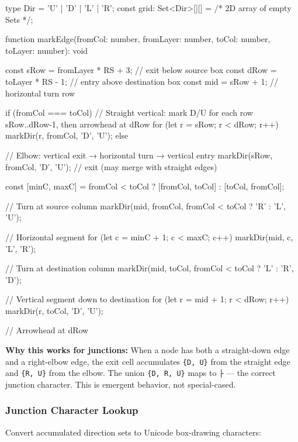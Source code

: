 \begin{CodeBlock}
type Dir = 'U' | 'D' | 'L' | 'R';
const grid: Set<Dir>[][] = /* 2D array of empty Sets */;

function markEdge(fromCol: number, fromLayer: number, toCol: number, toLayer: number): void {
  const sRow = fromLayer * RS + 3;   // exit below source box
  const dRow = toLayer * RS - 1;     // entry above destination box
  const mid = sRow + 1;              // horizontal turn row

  if (fromCol === toCol) {
    // Straight vertical: mark D/U for each row sRow..dRow-1, then arrowhead at dRow
    for (let r = sRow; r < dRow; r++) markDir(r, fromCol, 'D', 'U');
  } else {
    // Elbow: vertical exit → horizontal turn → vertical entry
    markDir(sRow, fromCol, 'D', 'U');          // exit (may merge with straight edges)

    const [minC, maxC] = fromCol < toCol ? [fromCol, toCol] : [toCol, fromCol];

    // Turn at source column
    markDir(mid, fromCol, fromCol < toCol ? 'R' : 'L', 'U');

    // Horizontal segment
    for (let c = minC + 1; c < maxC; c++) markDir(mid, c, 'L', 'R');

    // Turn at destination column
    markDir(mid, toCol, fromCol < toCol ? 'L' : 'R', 'D');

    // Vertical segment down to destination
    for (let r = mid + 1; r < dRow; r++) markDir(r, toCol, 'D', 'U');
  }
  // Arrowhead at dRow
}
\end{CodeBlock}

\textbf{Why this works for junctions:} When a node has both a straight-down edge and a right-elbow edge, the exit cell accumulates \texttt{\{\allowbreak{}D\allowbreak{},\allowbreak{} \allowbreak{}U\allowbreak{}\}} from the straight edge and \texttt{\{\allowbreak{}R\allowbreak{},\allowbreak{} \allowbreak{}U\allowbreak{}\}} from the elbow. The union \texttt{\{\allowbreak{}D\allowbreak{},\allowbreak{} \allowbreak{}R\allowbreak{},\allowbreak{} \allowbreak{}U\allowbreak{}\}} maps to \texttt{├} --- the correct junction character. This is emergent behavior, not special-cased.

\subsubsection{Junction Character Lookup}\label{record-426-junction-character-lookup}

Convert accumulated direction sets to Unicode box-drawing characters:

